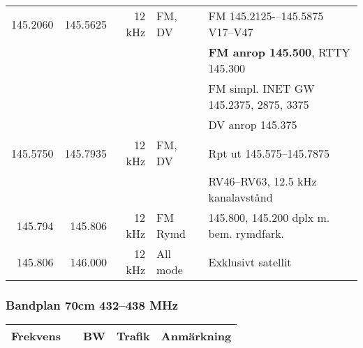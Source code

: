 \begin{landscape}
\begin{tabular}{rrrll}
145.2060 & 145.5625  & 12 kHz  & FM, DV       & FM 145.2125-–145.5875  V17–V47          \\
         &           &         &              & \textbf{FM anrop 145.500}, RTTY 145.300 \\
         &           &         &              & FM simpl. INET GW 145.2375, 2875, 3375  \\
         &           &         &              & DV anrop 145.375                        \\ \hline
145.5750 & 145.7935  & 12 kHz  & FM, DV       & Rpt ut 145.575--145.7875                \\
         &           &         &              & RV46–RV63, 12.5 kHz kanalavstånd        \\ \hline
145.794  & 145.806   & 12 kHz  & FM Rymd      & 145.800, 145.200 dplx m. bem. rymdfark. \\ \hline
145.806  & 146.000   & 12 kHz  & All mode     & Exklusivt satellit                      \\ \hline
\end{tabular}

\subsubsection{Bandplan 70cm 432--438 MHz}
\begin{tabular}{rrrll}
	\textbf{Frekvens} &          & \textbf{BW} & \textbf{Trafik} & \textbf{Anmärkning}                               \\ \hline


\end{tabular}
\end{landscape}
